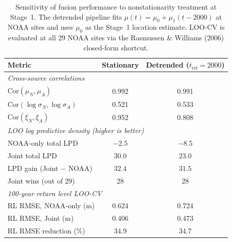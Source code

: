 \begin{table}[t]
\centering
\caption{Sensitivity of fusion performance to nonstationarity treatment at Stage~1.
The detrended pipeline fits $\mu(t) = \mu_0 + \mu_1(t - 2000)$ at NOAA sites
and uses $\mu_0$ as the Stage~1 location estimate. LOO-CV is evaluated at
all 29 NOAA sites via the Rasmussen \& Williams (2006) closed-form shortcut.}
\label{tab:detrend_robustness}
\begin{tabular}{lcc}
\toprule
Metric & Stationary & Detrended ($t_{\mathrm{ref}} = 2000$) \\
\midrule
\multicolumn{3}{l}{\textit{Cross-source correlations}} \\
\quad $\mathrm{Cor}(\mu_N, \mu_A)$ & 0.992 & 0.991 \\
\quad $\mathrm{Cor}(\log\sigma_N, \log\sigma_A)$ & 0.521 & 0.533 \\
\quad $\mathrm{Cor}(\xi_N, \xi_A)$ & 0.952 & 0.808 \\
\midrule
\multicolumn{3}{l}{\textit{LOO log predictive density (higher is better)}} \\
\quad NOAA-only total LPD & $-2.5$ & $-8.5$ \\
\quad Joint total LPD & $30.0$ & $23.0$ \\
\quad LPD gain (Joint $-$ NOAA) & $32.4$ & $31.5$ \\
\quad Joint wins (out of 29) & 28 & 28 \\
\midrule
\multicolumn{3}{l}{\textit{100-year return level LOO-CV}} \\
\quad RL RMSE, NOAA-only (m) & 0.624 & 0.724 \\
\quad RL RMSE, Joint (m) & 0.406 & 0.473 \\
\quad RL RMSE reduction (\%) & 34.9 & 34.7 \\
\bottomrule
\end{tabular}
\end{table}
